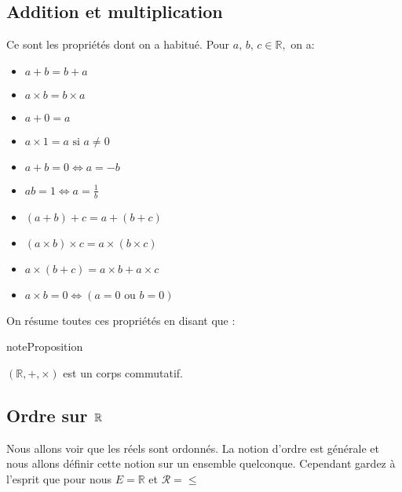 \documentclass[letterpaper,10pt,french]{jupyterBook}
\begin{document}
\subsection{Addition et multiplication}
\label{\detokenize{proprties:addition-et-multiplication}}
\sphinxAtStartPar
Ce sont les propriétés dont on a habitué. Pour \(a,\,b,\,c\in\mathbb{R},\) on a:
\begin{itemize}
\item {} 
\sphinxAtStartPar
\(a+b=b+a\)

\item {} 
\sphinxAtStartPar
\(a\times b=b\times a\)

\item {} 
\sphinxAtStartPar
\(a+0=a\)

\item {} 
\sphinxAtStartPar
\( a\times 1=a \mbox{ si } a\neq0\)

\item {} 
\sphinxAtStartPar
\(a+b=0\Leftrightarrow a=-b\)

\item {} 
\sphinxAtStartPar
\(ab=1\Leftrightarrow a=\frac{1}{b}\)

\item {} 
\sphinxAtStartPar
\((a+b)+c=a+(b+c)\)

\item {} 
\sphinxAtStartPar
\((a\times b)\times c=a\times(b\times c)\)

\item {} 
\sphinxAtStartPar
\(a\times(b+c)=a\times b+a\times c\)

\item {} 
\sphinxAtStartPar
\(a\times b=0\Leftrightarrow(a=0 \mbox{ ou } b=0)\)

\end{itemize}

\sphinxAtStartPar
On résume toutes ces propriétés en disant que :

\begin{sphinxadmonition}{note}{Proposition}

\sphinxAtStartPar
\((\mathbb{R},+,\times)\) est un corps commutatif.
\end{sphinxadmonition}


\subsection{Ordre sur \protect\(\mathbb{R}\protect\)}
\label{\detokenize{proprties:ordre-sur-mathbb-r}}
\sphinxAtStartPar
Nous allons voir que les réels sont ordonnés. La notion d’ordre est générale et nous allons définir cette notion sur un
ensemble quelconque. Cependant gardez à l’esprit que pour nous \(E=\mathbb{R}\) et \(\mathcal{R}=\leq\)
\end{document}
